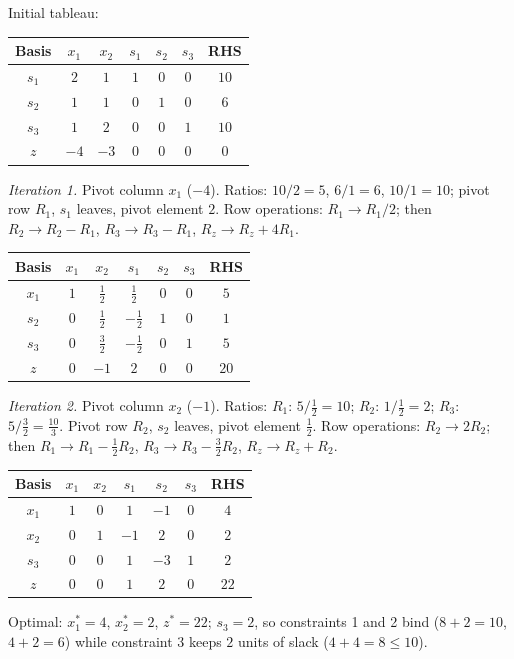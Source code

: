\begin{solutions}
  \item Initial tableau:
        \begin{center}
        \begin{tabular}{c|ccccc|c}
        Basis & $x_1$ & $x_2$ & $s_1$ & $s_2$ & $s_3$ & RHS\\
        \hline
        $s_1$ & $2$ & $1$ & $1$ & $0$ & $0$ & $10$\\
        $s_2$ & $1$ & $1$ & $0$ & $1$ & $0$ & $6$\\
        $s_3$ & $1$ & $2$ & $0$ & $0$ & $1$ & $10$\\
        \hline
        $z$ & $-4$ & $-3$ & $0$ & $0$ & $0$ & $0$\\
        \end{tabular}
        \end{center}
        \emph{Iteration 1.} Pivot column $x_1$ ($-4$). Ratios:
        $10/2=5$, $6/1=6$, $10/1=10$; pivot row $R_1$, $s_1$ leaves,
        pivot element $2$. Row operations: $R_1\to R_1/2$; then
        $R_2\to R_2-R_1$, $R_3\to R_3-R_1$, $R_z\to R_z+4R_1$.
        \begin{center}
        \begin{tabular}{c|ccccc|c}
        Basis & $x_1$ & $x_2$ & $s_1$ & $s_2$ & $s_3$ & RHS\\
        \hline
        $x_1$ & $1$ & $\tfrac{1}{2}$ & $\tfrac{1}{2}$ & $0$ & $0$ & $5$\\
        $s_2$ & $0$ & $\tfrac{1}{2}$ & $-\tfrac{1}{2}$ & $1$ & $0$ & $1$\\
        $s_3$ & $0$ & $\tfrac{3}{2}$ & $-\tfrac{1}{2}$ & $0$ & $1$ & $5$\\
        \hline
        $z$ & $0$ & $-1$ & $2$ & $0$ & $0$ & $20$\\
        \end{tabular}
        \end{center}
        \emph{Iteration 2.} Pivot column $x_2$ ($-1$). Ratios: $R_1$:
        $5\big/\tfrac{1}{2}=10$; $R_2$: $1\big/\tfrac{1}{2}=2$; $R_3$:
        $5\big/\tfrac{3}{2}=\tfrac{10}{3}$. Pivot row $R_2$, $s_2$
        leaves, pivot element $\tfrac{1}{2}$. Row operations:
        $R_2\to 2R_2$; then $R_1\to R_1-\tfrac{1}{2}R_2$,
        $R_3\to R_3-\tfrac{3}{2}R_2$, $R_z\to R_z+R_2$.
        \begin{center}
        \begin{tabular}{c|ccccc|c}
        Basis & $x_1$ & $x_2$ & $s_1$ & $s_2$ & $s_3$ & RHS\\
        \hline
        $x_1$ & $1$ & $0$ & $1$ & $-1$ & $0$ & $4$\\
        $x_2$ & $0$ & $1$ & $-1$ & $2$ & $0$ & $2$\\
        $s_3$ & $0$ & $0$ & $1$ & $-3$ & $1$ & $2$\\
        \hline
        $z$ & $0$ & $0$ & $1$ & $2$ & $0$ & $22$\\
        \end{tabular}
        \end{center}
        Optimal: $x_1^{*}=4$, $x_2^{*}=2$, $z^{*}=22$; $s_3=2$, so
        constraints 1 and 2 bind ($8+2=10$, $4+2=6$) while constraint 3
        keeps $2$ units of slack ($4+4=8\le 10$).


\end{solutions}
